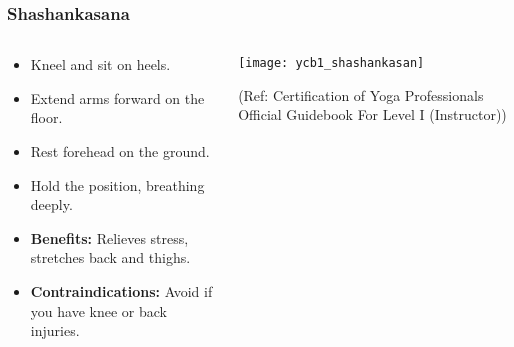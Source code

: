 \begin{frame}[fragile]\frametitle{Shashankasana}
\begin{columns}
    \begin{column}[T]{0.5\linewidth}
      \begin{itemize}
        \item Kneel and sit on heels.
        \item Extend arms forward on the floor.
        \item Rest forehead on the ground.
        \item Hold the position, breathing deeply.
        \item \textbf{Benefits:} Relieves stress, stretches back and thighs.
        \item \textbf{Contraindications:} Avoid if you have knee or back injuries.
      \end{itemize}
    \end{column}
    \begin{column}[T]{0.5\linewidth}
        \begin{center}
        \begin{center}
		        \texttt{[image: ycb1\_shashankasan]}
				
				{\tiny (Ref: Certification  of Yoga Professionals Official Guidebook For Level I (Instructor))}	        
		\end{center}   
        \end{center}    
    \end{column}
  \end{columns}
\end{frame}

